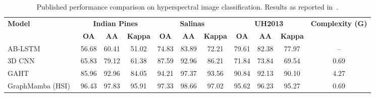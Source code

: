 \documentclass[acmsmall]{acmart}
\begin{document}
\begin{table}[h]
\centering
\caption{
Published performance comparison on hyperspectral image classification.
Results as reported in~\cite{yang2024graphmamba}.
}
\label{tab:RScomparison}
\scriptsize
\begin{tabular}{lcccccccccc}
\toprule
\multirow{2}{*}{\textbf{Model}} &
\multicolumn{3}{c}{\textbf{Indian Pines}} &
\multicolumn{3}{c}{\textbf{Salinas}} &
\multicolumn{3}{c}{\textbf{UH2013}} &
\multirow{2}{*}{\textbf{Complexity (G)}} \\
\cmidrule(lr){2-4}
\cmidrule(lr){5-7}
\cmidrule(lr){8-10}
&
\textbf{OA} & \textbf{AA} & \textbf{Kappa} &
\textbf{OA} & \textbf{AA} & \textbf{Kappa} &
\textbf{OA} & \textbf{AA} & \textbf{Kappa} & \\
\midrule

AB-LSTM~\cite{mei2021hyperspectral}
& 56.68 & 60.41 & 51.02
& 74.83 & 83.89 & 72.21
& 79.61 & 82.38 & 77.97 & -- \\

3D CNN~\cite{hamida2018deep}
& 65.83 & 79.12 & 61.38
& 87.59 & 92.96 & 86.21
& 71.84 & 73.84 & 69.54 & 0.69 \\

GAHT~\cite{mei2022hyperspectral}
& 85.96 & 92.96 & 84.05
& 94.21 & 97.37 & 93.56
& 90.84 & 92.13 & 90.10 & 4.27 \\

\rowcolor{lightgray}
GraphMamba (HSI)~\cite{yang2024graphmamba}
& 96.43 & 97.83 & 95.91
& 97.33 & 98.66 & 97.02
& 95.62 & 96.23 & 95.27 & 0.69 \\

\bottomrule
\end{tabular}
\end{table}
\end{document}
